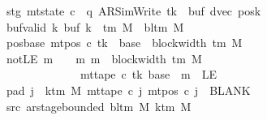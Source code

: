 \begin{isabellebody}
\ \ \ \ \ \ \ stg{\isacharcolon}{\kern0pt}\ {\isachardoublequoteopen}mt{\isacharunderscore}{\kern0pt}state\ c{}\ {\isacharequal}{\kern0pt}\ {\isacharparenleft}{\kern0pt}q{\isacharcomma}{\kern0pt}\ AR{\isacharunderscore}{\kern0pt}SimWrite{\isacharcomma}{\kern0pt}\ tk{\isacharcomma}{\kern0pt}\ {}{\isacharcomma}{\kern0pt}\ buf{\isacharcomma}{\kern0pt}\ dvec{\isacharcomma}{\kern0pt}\ posk{\isacharparenright}{\kern0pt}{\isachardoublequoteclose}\isanewline
\ \ \ \ \ \ \ buf{\isacharunderscore}{\kern0pt}valid{\isacharcolon}{\kern0pt}\ {\isachardoublequoteopen}{\isasymforall}k{\isachardot}{\kern0pt}\ buf\ k\ {\isasymin}\ {\isasymGamma}{\isacharunderscore}{\kern0pt}tm\ M\ {\isasymunion}\ {\isacharbraceleft}{\kern0pt}bl{\isacharunderscore}{\kern0pt}tm\ M{\isacharbraceright}{\kern0pt}{\isachardoublequoteclose}\isanewline
\ \ \ \ \ \ \ pos{\isacharunderscore}{\kern0pt}base{\isacharcolon}{\kern0pt}\ {\isachardoublequoteopen}mt{\isacharunderscore}{\kern0pt}pos\ c{}\ tk\ {\isacharequal}{\kern0pt}\ base\ {\isacharplus}{\kern0pt}\ block{\isacharunderscore}{\kern0pt}width\ {\isacharparenleft}{\kern0pt}{\isasymGamma}{\isacharunderscore}{\kern0pt}tm\ M{\isacharparenright}{\kern0pt}{\isachardoublequoteclose}\isanewline
\ \ \ \ \ \ \ notLE{\isacharcolon}{\kern0pt}\ {\isachardoublequoteopen}{\isasymAnd}m{\isachardot}{\kern0pt}\ {\isasymlbrakk}\ {}\ {\isasymle}\ m{\isacharsemicolon}{\kern0pt}\ m\ {\isasymle}\ block{\isacharunderscore}{\kern0pt}width\ {\isacharparenleft}{\kern0pt}{\isasymGamma}{\isacharunderscore}{\kern0pt}tm\ M{\isacharparenright}{\kern0pt}\ {\isasymrbrakk}\isanewline
\ \ \ \ \ \ \ \ \ \ \ \ \ \ \ \ \ \ \ {\isasymLongrightarrow}\ mt{\isacharunderscore}{\kern0pt}tape\ c{}\ tk\ {\isacharparenleft}{\kern0pt}base\ {\isacharplus}{\kern0pt}\ m{\isacharparenright}{\kern0pt}\ {\isasymnoteq}\ LE{}{\isachardoublequoteclose}\isanewline
\ \ \ \ \ \ \ pad{}{\isacharcolon}{\kern0pt}\ {\isachardoublequoteopen}{\isasymforall}j\ {\isasymge}\ k{\isacharunderscore}{\kern0pt}tm\ M{\isachardot}{\kern0pt}\ mt{\isacharunderscore}{\kern0pt}tape\ c{}\ j\ {\isacharparenleft}{\kern0pt}mt{\isacharunderscore}{\kern0pt}pos\ c{}\ j{\isacharparenright}{\kern0pt}\ {\isacharequal}{\kern0pt}\ BLANK{}{\isachardoublequoteclose}\isanewline
\ \ \ \ \ \ \ src{}{\isacharcolon}{\kern0pt}\ {\isachardoublequoteopen}ar{\isacharunderscore}{\kern0pt}stage{\isacharunderscore}{\kern0pt}bounded\ {\isacharparenleft}{\kern0pt}bl{\isacharunderscore}{\kern0pt}tm\ M{\isacharparenright}{\kern0pt}\ {\isacharparenleft}{\kern0pt}k{\isacharunderscore}{\kern0pt}tm\ M{\isacharparenright}{\kern0pt}\isanewline

\end{isabellebody}
